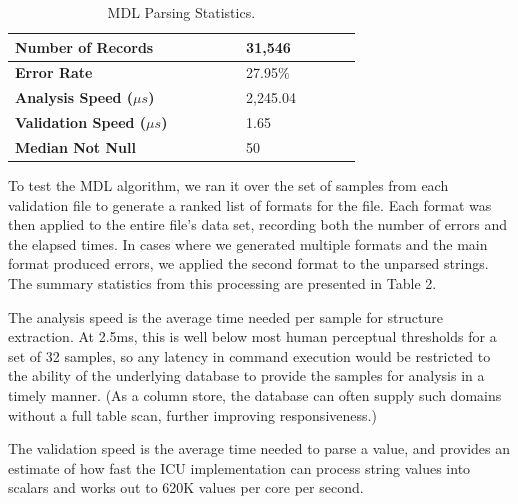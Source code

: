 \begin{table}[ht]
\centering
\bgroup
\def\arraystretch{1.5}
\begin{tabular}{|p{0.48\linewidth}| p{0.24\linewidth}|}
\hline
\textbf{Number of Records} & 31,546\\ \hline
\textbf{Error Rate} & 27.95\% \\ \hline
\textbf{Analysis Speed ($\mu s$)} & 2,245.04 \\ \hline
\textbf{Validation Speed ($\mu s$)} & 1.65 \\ \hline
\textbf{Median Not Null} & 50 \\ \hline
\end{tabular}
\egroup
\label{tab:mdlstats}
\caption{MDL Parsing Statistics.}
\end{table}

To test the MDL algorithm, we ran it over the set of samples from each validation file to generate a ranked list of formats for the file. Each format was then applied to the entire file's data set, recording both the number of errors and the elapsed times. In cases where we generated multiple formats and the main format produced errors, we applied the second format to the unparsed strings. The summary statistics from this processing are presented in Table 2.

The analysis speed is the average time needed per sample for structure extraction. At 2.5ms, this is well below most human perceptual thresholds for a set of 32 samples, so any latency in command execution would be restricted to the ability of the underlying database to provide the samples for analysis in a timely manner. (As a column store, the database can often supply such domains without a full table scan, further improving responsiveness.) 

The validation speed is the average time needed to parse a value, and provides an estimate of how fast the ICU implementation can process string values into scalars and works out to 620K values per core per second.\\
 
